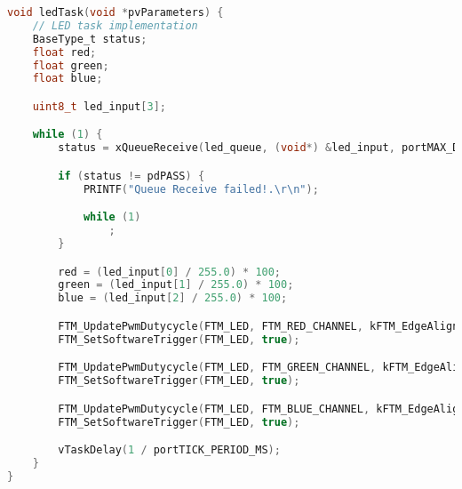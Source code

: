 \begin{lstlisting}[language=c,caption=LED Task, label=list:led]
void ledTask(void *pvParameters) {
    // LED task implementation
    BaseType_t status;
    float red;
    float green;
    float blue;

    uint8_t led_input[3];

    while (1) {
        status = xQueueReceive(led_queue, (void*) &led_input, portMAX_DELAY);

        if (status != pdPASS) {
            PRINTF("Queue Receive failed!.\r\n");

            while (1)
                ;
        }

        red = (led_input[0] / 255.0) * 100;
        green = (led_input[1] / 255.0) * 100;
        blue = (led_input[2] / 255.0) * 100;

        FTM_UpdatePwmDutycycle(FTM_LED, FTM_RED_CHANNEL, kFTM_EdgeAlignedPwm, (uint8_t) red);
        FTM_SetSoftwareTrigger(FTM_LED, true);

        FTM_UpdatePwmDutycycle(FTM_LED, FTM_GREEN_CHANNEL, kFTM_EdgeAlignedPwm, (uint8_t) green);
        FTM_SetSoftwareTrigger(FTM_LED, true);

        FTM_UpdatePwmDutycycle(FTM_LED, FTM_BLUE_CHANNEL, kFTM_EdgeAlignedPwm, (uint8_t) blue);
        FTM_SetSoftwareTrigger(FTM_LED, true);

        vTaskDelay(1 / portTICK_PERIOD_MS);
    }
}
\end{lstlisting}
